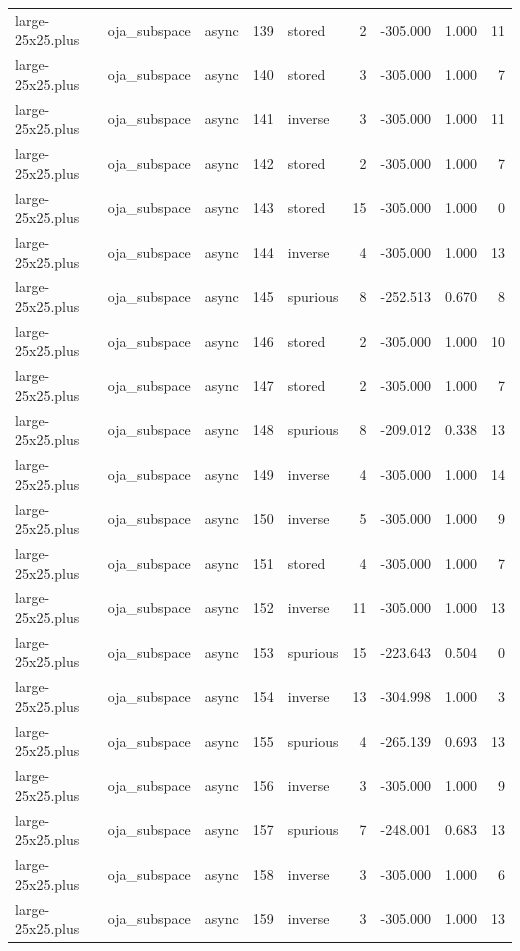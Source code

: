 \begin{tabular}{lllrlrrrr}
large-25x25.plus & oja\_subspace & async & 139 & stored & 2 & -305.000 & 1.000 & 11 \\
large-25x25.plus & oja\_subspace & async & 140 & stored & 3 & -305.000 & 1.000 & 7 \\
large-25x25.plus & oja\_subspace & async & 141 & inverse & 3 & -305.000 & 1.000 & 11 \\
large-25x25.plus & oja\_subspace & async & 142 & stored & 2 & -305.000 & 1.000 & 7 \\
large-25x25.plus & oja\_subspace & async & 143 & stored & 15 & -305.000 & 1.000 & 0 \\
large-25x25.plus & oja\_subspace & async & 144 & inverse & 4 & -305.000 & 1.000 & 13 \\
large-25x25.plus & oja\_subspace & async & 145 & spurious & 8 & -252.513 & 0.670 & 8 \\
large-25x25.plus & oja\_subspace & async & 146 & stored & 2 & -305.000 & 1.000 & 10 \\
large-25x25.plus & oja\_subspace & async & 147 & stored & 2 & -305.000 & 1.000 & 7 \\
large-25x25.plus & oja\_subspace & async & 148 & spurious & 8 & -209.012 & 0.338 & 13 \\
large-25x25.plus & oja\_subspace & async & 149 & inverse & 4 & -305.000 & 1.000 & 14 \\
large-25x25.plus & oja\_subspace & async & 150 & inverse & 5 & -305.000 & 1.000 & 9 \\
large-25x25.plus & oja\_subspace & async & 151 & stored & 4 & -305.000 & 1.000 & 7 \\
large-25x25.plus & oja\_subspace & async & 152 & inverse & 11 & -305.000 & 1.000 & 13 \\
large-25x25.plus & oja\_subspace & async & 153 & spurious & 15 & -223.643 & 0.504 & 0 \\
large-25x25.plus & oja\_subspace & async & 154 & inverse & 13 & -304.998 & 1.000 & 3 \\
large-25x25.plus & oja\_subspace & async & 155 & spurious & 4 & -265.139 & 0.693 & 13 \\
large-25x25.plus & oja\_subspace & async & 156 & inverse & 3 & -305.000 & 1.000 & 9 \\
large-25x25.plus & oja\_subspace & async & 157 & spurious & 7 & -248.001 & 0.683 & 13 \\
large-25x25.plus & oja\_subspace & async & 158 & inverse & 3 & -305.000 & 1.000 & 6 \\
large-25x25.plus & oja\_subspace & async & 159 & inverse & 3 & -305.000 & 1.000 & 13 \\

\end{tabular}
